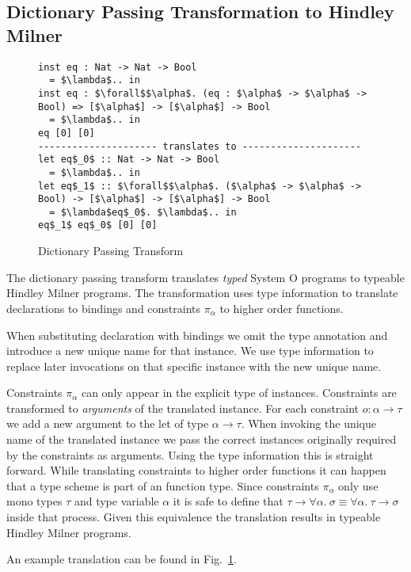 \documentclass[runningheads]{llncs}
\newcommand{\snip}[1]{\footnotesize{\ttfamily{#1}}}
\begin{document}
\subsection{Dictionary Passing Transformation to Hindley Milner}
\begin{figure}
  \begin{lstlisting}
inst eq : Nat -> Nat -> Bool 
  = $\lambda$.. in                 
inst eq : $\forall$$\alpha$. (eq : $\alpha$ -> $\alpha$ -> Bool) => [$\alpha$] -> [$\alpha$] -> Bool 
  = $\lambda$.. in
eq [0] [0]
--------------------- translates to ---------------------
let eq$_0$ :: Nat -> Nat -> Bool
  = $\lambda$.. in
let eq$_1$ :: $\forall$$\alpha$. ($\alpha$ -> $\alpha$ -> Bool) -> [$\alpha$] -> [$\alpha$] -> Bool     
  = $\lambda$eq$_0$. $\lambda$.. in
eq$_1$ eq$_0$ [0] [0]  
  \end{lstlisting}
  \caption{Dictionary Passing Transform} \label{transform}
\end{figure}
The dictionary passing transform translates \emph{typed} System O programs to typeable Hindley Milner programs. The transformation uses type information to translate \snip{inst} declarations to \snip{let} bindings and constraints $\pi_\alpha$ to higher order functions. 

When substituting \snip{inst} declaration with \snip{let} bindings we omit the type annotation and introduce a new unique name for that instance. We  use type information to replace later invocations on that specific instance with the new unique name. 

Constraints $\pi_\alpha$ can only appear in the explicit type of instances. Constraints are transformed to \emph{arguments} of the translated instance. For each constraint $o : \alpha \rightarrow \tau$ we add a new argument to the let of type $\alpha \rightarrow \tau$. When invoking the unique name of the translated instance we pass the correct instances originally required by the constraints as arguments. Using the type information this is straight forward. While translating constraints to higher order functions it can happen that a type scheme is part of an function type. Since constraints $\pi_\alpha$ only use mono types $\tau$ and type variable $\alpha$ it is safe to define that $\tau \rightarrow \forall \alpha. \ \sigma \equiv \forall \alpha. \ \tau \rightarrow \sigma$ inside that process. Given this equivalence the translation results in typeable Hindley Milner programs.

An example translation can be found in Fig.~\ref{transform}.
\end{document}
